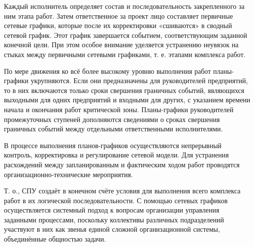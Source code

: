 Каждый исполнитель определяет состав и последовательность закрепленного за ним этапа работ. Затем ответственное за проект лицо составляет первичные сетевые графики, которые после их корректировки «сшиваются» в сводный сетевой график. Этот график завершается событием, соответствующим заданной конечной цели. При этом особое внимание уделяется устранению неувязок на стыках между первичными сетевыми графиками, т. е. этапами комплекса работ.

По мере движения ко всё более высокому уровню выполнения работ планы-графики укрупняются. Если они предназначены для руководителей предприятий, то в них включаются только сроки свершения граничных событий, являющихся выходными для одних предприятий и входными для других, с указанием времени начала и окончания работ критической зоны. Планы-графики руководителей промежуточных ступеней дополняются сведениями о сроках свершения граничных событий между отдельными ответственными исполнителями.

В процессе выполнения планов-графиков осуществляются непрерывный контроль, корректировка и регулирование сетевой модели. Для устранения расхождений между запланированным и фактическим ходом работ проводятся организационно-технические мероприятия.

Т. о., СПУ создаёт в конечном счёте условия для выполнения всего комплекса работ в их логической последовательности. С помощью сетевых графиков осуществляется системный подход к вопросам организации управления заданными процессами, поскольку коллективы различных подразделений участвуют в них как звенья единой сложной организационной системы, объединённые общностью задачи.